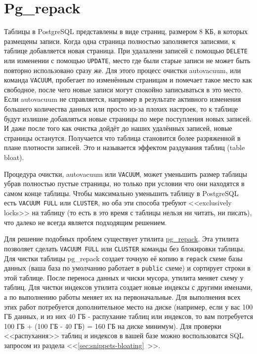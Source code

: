 \section{Pg\_repack}

Таблицы в PostgreSQL представлены в виде страниц, размером 8 КБ, в которых размещены записи. Когда одна страница полностью заполняется записями, к таблице добавляется новая страница. При удалалени записей с помощью \lstinline!DELETE! или изменении с помощью \lstinline!UPDATE!, место где были старые записи не может быть повторно использовано сразу же. Для этого процесс очистки autovacuum, или команда \lstinline!VACUUM!, пробегает по изменённым страницам и помечает такое место как свободное, после чего новые записи могут спокойно записываться в это место. Если autovacuum не справляется, например в результате активного изменения большего количества данных или просто из-за плохих настроек, то к таблице будут излишне добавляться новые страницы по мере поступления новых записей. И даже после того как очистка дойдёт до наших удалённых записей, новые страницы останутся. Получается что таблица становится более разряженной в плане плотности записей. Это и называется эффектом раздувания таблиц (table bloat).

Процедура очистки, autovacuum или \lstinline!VACUUM!, может уменьшить размер таблицы убрав полностью пустые страницы, но только при условии что они находятся в самом конце таблицы. Чтобы максимально уменьшить таблицу в PostgreSQL есть \lstinline!VACUUM FULL! или \lstinline!CLUSTER!, но оба эти способа требуют <<exclusively locks>> на таблицу (то есть в это время с таблицы нельзя ни читать, ни писать), что далеко не всегда является подходящим решением.

Для решение подобных проблем существует утилита \href{http://reorg.github.io/pg\_repack/}{pg\_repack}. Эта утилита позволяет сделать \lstinline!VACUUM FULL! или \lstinline!CLUSTER! команды без блокировки таблицы. Для чистки таблицы pg\_repack создает точную её копию в \lstinline!repack! схеме базы данных (ваша база по умолчанию работает в \lstinline!public! схеме) и сортирует строки в этой таблице. После переноса данных и чиски мусора, утилита меняет схему у таблиц. Для чистки индексов утилита создает новые индексы с другими именами, а по выполнению работы меняет их на первоначальные. Для выполнения всех этих работ потребуется дополнительное место на диске (например, если у вас 100 ГБ данных, и из них 40 ГБ - распухание таблиц или индексов, то вам потребуется 100 ГБ + (100 ГБ - 40 ГБ) = 160 ГБ на диске минимум). Для проверки <<распухания>> таблиц и индексов в вашей базе можно воспользоватся SQL запросом из раздела <<\ref{sec:snippets-bloating}~>>.

